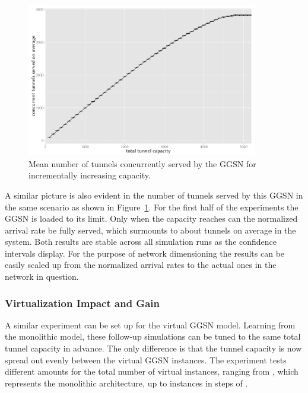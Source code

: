 \begin{figure}[htb]
	\centering
	\includegraphics[width=0.9\textwidth]{images/R-monolithic-tunnelusage.pdf}
	\caption{Mean number of tunnels concurrently served by the \acrshort{GGSN} for incrementally increasing capacity.}
\label{c4:fig:traditional_tunnelusage}
\end{figure}

A similar picture is also evident in the number of tunnels served by this \gls{GGSN} in the same scenario as shown in Figure~\ref{c4:fig:traditional_tunnelusage}. For the first half of the experiments the \gls{GGSN} is loaded to its limit. Only when the capacity reaches  can the normalized arrival rate be fully served, which surmounts to about  tunnels on average in the system. Both results are stable across all simulation runs as the confidence intervals display. For the purpose of network dimensioning the results can be easily scaled up from the normalized arrival rates to the actual ones in the network in question.


\subsubsection{Virtualization Impact and Gain}

A similar experiment can be set up for the virtual \gls{GGSN} model. Learning from the monolithic model, these follow-up simulations can be tuned to the same total tunnel capacity in advance. The only difference is that the tunnel capacity is now spread out evenly between the virtual \gls{GGSN} instances. The experiment tests different amounts for the total number of virtual instances, ranging from , which represents the monolithic architecture, up to  instances in steps of .


